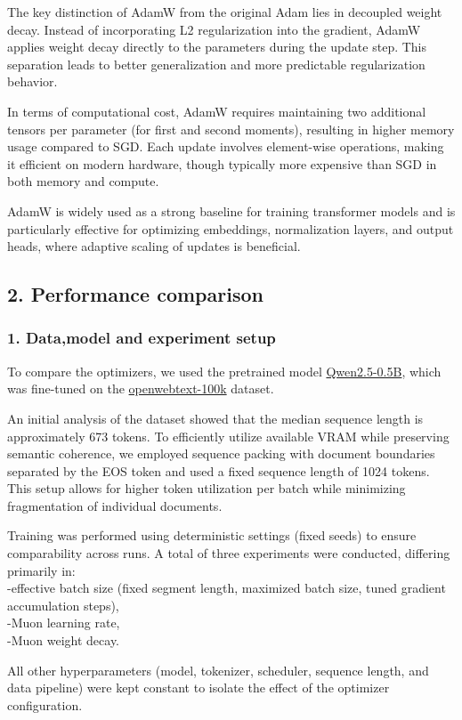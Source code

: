 \documentclass[
]{article}
\begin{document}
The key distinction of AdamW from the original Adam lies in decoupled
weight decay. Instead of incorporating L2 regularization into the
gradient, AdamW applies weight decay directly to the parameters during
the update step. This separation leads to better generalization and more
predictable regularization behavior.

In terms of computational cost, AdamW requires maintaining two
additional tensors per parameter (for first and second moments),
resulting in higher memory usage compared to SGD. Each update involves
element-wise operations, making it efficient on modern hardware, though
typically more expensive than SGD in both memory and compute.

AdamW is widely used as a strong baseline for training transformer
models and is particularly effective for optimizing embeddings,
normalization layers, and output heads, where adaptive scaling of
updates is beneficial. 
\subsection{ 2. Performance comparison }
\subsubsection{ 1. Data,model and experiment setup} 
To compare the optimizers, we used the
pretrained model
\href{https://huggingface.co/Qwen/Qwen2.5-0.5B}{Qwen2.5-0.5B}, which was
fine-tuned on the
\href{https://huggingface.co/datasets/Elriggs/openwebtext-100k}{openwebtext-100k}
dataset.

An initial analysis of the dataset showed that the median sequence
length is approximately 673 tokens. To efficiently utilize available
VRAM while preserving semantic coherence, we employed sequence packing
with document boundaries separated by the EOS token and used a fixed
sequence length of 1024 tokens. This setup allows for higher token
utilization per batch while minimizing fragmentation of individual
documents.

Training was performed using deterministic settings (fixed seeds) to
ensure comparability across runs. A total of three experiments were
conducted, differing primarily in:\\
-effective batch size (fixed segment length, maximized batch size, tuned
gradient accumulation steps),\\
-Muon learning rate,\\
-Muon weight decay.

All other hyperparameters (model, tokenizer, scheduler, sequence length,
and data pipeline) were kept constant to isolate the effect of the
optimizer configuration.
\end{document}
